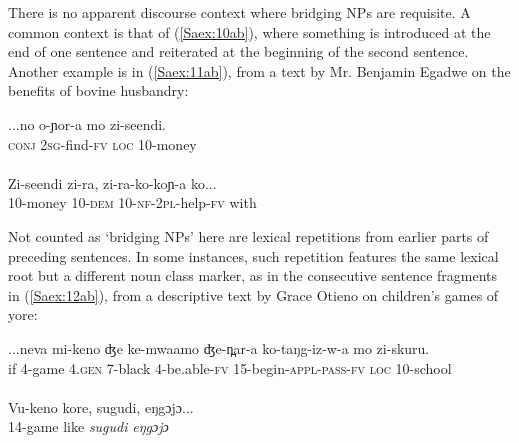 \documentclass[output=paper]{LSP/langsci}
\begin{document}
There is no apparent discourse context where bridging NPs are requisite. A common context is that of (\ref{Saex:10ab}), where something is introduced at the end of one sentence and reiterated at the beginning of the second sentence. Another example is in (\ref{Saex:11ab}), from a text by Mr. Benjamin Egadwe on the benefits of bovine husbandry:


\begin{exe}
\ex \label{Saex:11ab}
\begin{xlist}
\ex \label{Saex:11a}
\gll ...no  o-ɲor-a   mo   zi-seendi. \\
 \textsc{conj}  \textsc{2sg}-find-\textsc{fv}  \textsc{loc}  10-money\\
\glt {}\\
\ex \label{Saex:11b}
\gll Zi-seendi   zi-ra,     zi-ra-ko-koɲ-a   ko...\\     	       
  10-money  10-\textsc{dem}  10-\textsc{nf-2pl-}help-\textsc{fv}  with\\
\glt {} 
\end{xlist}
\end{exe}


Not counted as `bridging NPs' here are lexical repetitions from earlier parts of preceding sentences. In some instances, such repetition features the same lexical root but a different noun class marker, as in the consecutive sentence fragments in (\ref{Saex:12ab}), from a descriptive text by Grace Otieno on children’s games of yore: 


\begin{exe}
\ex \label{Saex:12ab}
\begin{xlist}
\ex \label{Saex:12a}
\gll ...neva  mi-keno   ʤe   ke-mwaamo  ʤe-n̪ar-a ko-taŋg-iz-w-a     mo   zi-skuru. \\
 if  4-game    4.\textsc{gen}  7-black    4-be.able-\textsc{fv}  15-begin-\textsc{appl}-\textsc{pass}-\textsc{fv}    \textsc{loc}  10-school\\
\glt {}\\
\ex \label{Saex:12b}
\gll Vu-keno   kore,  sugudi,   eŋgɔjɔ...\\     	       
  14-game  like  \textit{sugudi}    \textit{eŋgɔjɔ}\\
\glt {} 
\end{xlist}
\end{exe}
\end{document}
